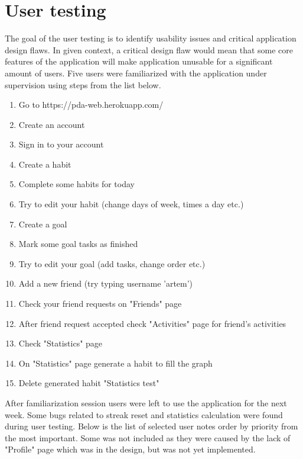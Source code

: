
\section{User testing}\label{sec:user-testing}

The goal of the user testing is to identify usability issues and critical application design flaws.
In given context, a critical design flaw would mean that some core features of the application
will make application unusable for a significant amount of users.
Five users were familiarized with the application under supervision using steps from the list below.

\begin{enumerate}
    \item Go to https://pda-web.herokuapp.com/
    \item Create an account
    \item Sign in to your account
    \item Create a habit
    \item Complete some habits for today
    \item Try to edit your habit (change days of week, times a day etc.)
    \item Create a goal
    \item Mark some goal tasks as finished
    \item Try to edit your goal (add tasks, change order etc.)
    \item Add a new friend (try typing username 'artem')
    \item Check your friend requests on "Friends" page
    \item After friend request accepted check "Activities" page for friend's activities
    \item Check "Statistics" page
    \item On "Statistics" page generate a habit to fill the graph
    \item Delete generated habit "Statistics test"
\end{enumerate}

After familiarization session users were left to use the application for the next week.
Some bugs related to streak reset and statistics calculation were found during user testing.
Below is the list of selected user notes order by priority from the most important.
Some was not included as they were caused by the lack of "Profile" page which was in the design, but was not yet implemented.

